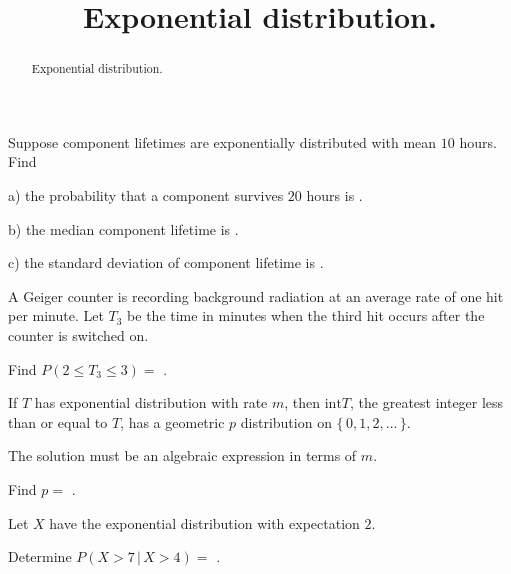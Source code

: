 \documentclass{ximera}
\title{Exponential distribution.}
\begin{document}
\begin{abstract}
Exponential distribution.
\end{abstract}
\maketitle

Suppose component lifetimes are exponentially distributed with mean $10$ hours. Find

\begin{question} 
     \begin{solution}
          a) the probability that a component survives $20$ hours is  .
     \end{solution}
\end{question}

\begin{question} 
     \begin{solution}
          b) the median component lifetime is  .
     \end{solution}
\end{question}

\begin{question} 
     \begin{solution}
          c) the standard deviation of component lifetime is  .
     \end{solution}
\end{question}

A Geiger counter is recording background radiation at an average rate of one hit per minute. Let $T_{3}$ be the time in minutes when the third hit occurs after the counter is switched on.

\begin{question}
     \begin{solution}
          Find $P( 2 \leq T_{3} \leq 3 ) = $ .
     \end{solution}
\end{question} 

If $T$ has exponential distribution with rate $m$, then $\text{int}T$, the greatest integer less than or equal to $T$, has a geometric $p$ distribution on $\{\, 0,1,2,\dots \,\}$.

 \begin{question}
     \begin{hint}
          The solution must be an algebraic expression in terms of $m$.
     \end{hint}
     \begin{solution}
          Find $p = $ .
     \end{solution}
\end{question}

Let $X$ have the exponential distribution with expectation $2$.

\begin{question}
     \begin{solution}
          Determine $P( X > 7 \,\vert\,  X > 4 ) = $ .
     \end{solution}
\end{question} 
\end{document}
